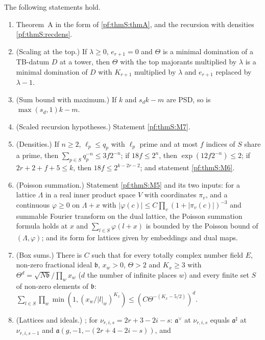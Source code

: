 \begin{theorem}\label{pf:thmS:globalcores}
The following statements hold.
\begin{enumerate}[label=(GI\arabic*)]
\item\label{pf:thmS:GI1} Theorem~A in the form of \cref{pf:thmS:thmA}, and the recursion with densities \cref{pf:thmS:recdens}.
\item\label{pf:thmS:GI2} (Scaling at the top.) If $\lambda\ge0$, $e_{r+1}=0$ and $\Theta$ is a minimal domination of a TB-datum $D$
at a tower, then $\Theta$ with the top majorants multiplied by $\lambda$ is a minimal domination of $D$ with $K_{r+1}$
multiplied by $\lambda$ and $e_{r+1}$ replaced by $\lambda-1$.
\item\label{pf:thmS:GI3} (Sum bound with maximum.) If $k$ and $s_dk-m$ are PSD, so is $\max(s_d,1)k-m$.
\item\label{pf:thmS:GI4} (Scaled recursion hypotheses.) Statement \ref{pf:thmS:M7}.
\item\label{pf:thmS:GI5} (Densities.) If $n\ge2$, $\ell_p\le q_p$ with $\ell_p$ prime and at most $f$ indices of $S$ share a prime,
then $\sum_{p\in S}q_p^{-n}\le3f2^{-n}$; if $18f\le2^n$, then $\exp(12f2^{-n})\le2$; if $2r+2+f+5\le k$, then
$18f\le2^{k-2r-2}$; and statement \ref{pf:thmS:M6}.
\item\label{pf:thmS:GI6} (Poisson summation.) Statement \ref{pf:thmS:M5} and its two inputs: for a lattice $\Lambda$ in a real
inner product space $V$ with coordinates $\pi_v$, and a continuous $\varphi\ge0$ on $\Lambda+x$ with
$|\varphi(c)|\le C\prod_v(1+|\pi_v(c)|)^{-3}$ and summable Fourier transform on the dual lattice, the Poisson summation formula holds
at $x$ and $\sum_{l\in S}\varphi(l+x)$ is bounded by the Poisson bound of $(\Lambda,\varphi)$; and its form for lattices given by
embeddings and dual maps.
\item\label{pf:thmS:GI7} (Box sums.) There is $C$ such that for every totally complex number field $E$, non-zero fractional ideal
$\mathfrak b$, $x_w>0$, $\Theta>2$ and $K_x\ge3$ with $\Theta^{d}=\sqrt{N\mathfrak b}/\prod_wx_w$ ($d$ the number of infinite
places $w$) and every finite set $S$ of non-zero elements of $\mathfrak b$:
$\sum_{l\in S}\prod_w\min(1,(x_w/|l|_w)^{K_x})\le(C\Theta^{-(K_x-5/2)})^{d}$.
\item\label{pf:thmS:GI8} (Lattices and ideals.) ; for $\nu_{r,i,s}=2r+3-2i-s$:
$\mathfrak a^\vee$ at $\nu_{r,i,s}$ equals $\mathfrak a^\sharp$ at $\nu_{r,i,s-1}$ and $\mathfrak a(g,-1,-(2r+4-2i-s))$, and

\end{enumerate}
\end{theorem}
